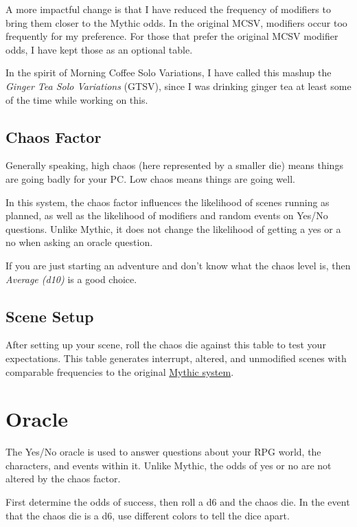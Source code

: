 A more impactful change is that I have reduced the frequency of modifiers to
bring them closer to the Mythic odds. In the original MCSV, modifiers occur too
frequently for my preference. For those that prefer the original MCSV modifier odds,
I have kept those as an optional table.

In the spirit of Morning Coffee Solo Variations, I have called this mashup the
\emph{Ginger Tea Solo Variations} (GTSV), since I was drinking ginger tea at
least some of the time while working on this.

\subsection{Chaos Factor}
Generally speaking, high chaos (here represented by a smaller die) means things
are going badly for your PC. Low chaos means things are going well.

In this system, the chaos factor influences the likelihood of scenes running as
planned, as well as the likelihood of modifiers and random events on Yes/No
questions. Unlike Mythic, it does not change the likelihood of getting a yes or
a no when asking an oracle question.

If you are just starting an adventure and don't know what the chaos level is,
then \emph{Average (d10)} is a good choice.

\vfill\pagebreak


\subsection{Scene Setup}
After setting up your scene, roll the chaos die against this table to test your
expectations. This table generates interrupt, altered, and unmodified scenes
with comparable frequencies to the original
\href{https://www.wordmillgames.com/mythic-gme.html}{Mythic system}.


\section{Oracle}
The Yes/No oracle is used to answer questions about your RPG world, the
characters, and events within it. Unlike Mythic, the odds of yes or no are not
altered by the chaos factor.

First determine the odds of success, then roll a d6 and the chaos die. In the
event that the chaos die is a d6, use different colors to tell the dice apart.

